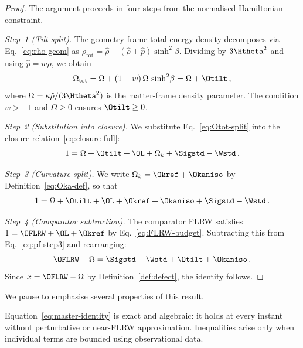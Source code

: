 \begin{proof}
The argument proceeds in four steps from the normalised
Hamiltonian constraint.

\emph{Step~1 (Tilt split).}
The geometry-frame total energy density decomposes via
Eq.~\eqref{eq:rho-geom} as
$\rho_{\mathrm{tot}} = \hat{\rho}
+ (\hat{\rho} + \hat{p})\sinh^2\!\beta$.
Dividing by $3\Htheta^2$ and using
$\hat{p} = w\hat{\rho}$, we obtain
\begin{equation}\label{eq:Otot-split}
\Omega_{\mathrm{tot}}
= \Omega + (1+w)\,\Omega\,\sinh^2\!\beta
= \Omega + \Otilt\,,
\end{equation}
where $\Omega = \kappa\hat{\rho}/(3\Htheta^2)$ is the
matter-frame density parameter.  The condition $w > -1$ and
$\Omega \geq 0$ ensures $\Otilt \geq 0$.

\emph{Step~2 (Substitution into closure).}
We substitute Eq.~\eqref{eq:Otot-split} into the closure
relation~\eqref{eq:closure-full}:
\begin{equation}\label{eq:pf-step2}
1 = \Omega + \Otilt + \OL + \Omega_k
  + \Sigstd - \Wstd\,.
\end{equation}

\emph{Step~3 (Curvature split).}
We write $\Omega_k = \Okref + \Okaniso$ by
Definition~\eqref{eq:Oka-def}, so that
\begin{equation}\label{eq:pf-step3}
1 = \Omega + \Otilt + \OL + \Okref + \Okaniso
  + \Sigstd - \Wstd\,.
\end{equation}

\emph{Step~4 (Comparator subtraction).}
The comparator FLRW satisfies $1 = \OFLRW + \OL + \Okref$
by Eq.~\eqref{eq:FLRW-budget}.  Subtracting this from
Eq.~\eqref{eq:pf-step3} and rearranging:
\begin{equation}
\OFLRW - \Omega
= \Sigstd - \Wstd + \Otilt + \Okaniso\,.
\end{equation}
Since $x = \OFLRW - \Omega$ by
Definition~\ref{def:defect}, the identity follows.
\end{proof}

We pause to emphasise several properties of this result.

\begin{remark}\label{rem:identity}
Equation~\eqref{eq:master-identity} is exact and algebraic:
it holds at every instant without perturbative or near-FLRW
approximation.  Inequalities arise only when individual terms
are bounded using observational data.
\end{remark}

